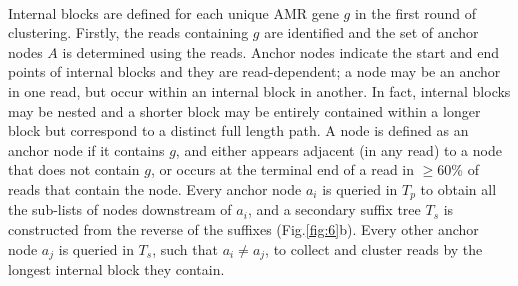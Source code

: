\paragraph{}
Internal blocks are defined for each unique AMR gene $g$ in the first round of clustering. Firstly, the reads containing $g$ are identified and the set of anchor nodes $A$ is determined using the reads. Anchor nodes indicate the start and end points of internal blocks and they are read-dependent; a node may be an anchor in one read, but occur within an internal block in another. In fact, internal blocks may be nested and a shorter block may be entirely contained within a longer block but correspond to a distinct full length path. A node is defined as an anchor node if it contains $g$, and either appears adjacent (in any read) to a node that does not contain $g$, or occurs at the terminal end of a read in $\ge$60\% of reads that contain the node. Every anchor node $a_i$ is queried in $T_p$ to obtain all the sub-lists of nodes downstream of $a_i$, and a secondary suffix tree $T_s$ is constructed from the reverse of the suffixes (Fig.\ref{fig:6}b). Every other anchor node $a_j$ is queried in $T_s$, such that $a_i \neq a_j$, to collect and cluster reads by the longest internal block they contain.
